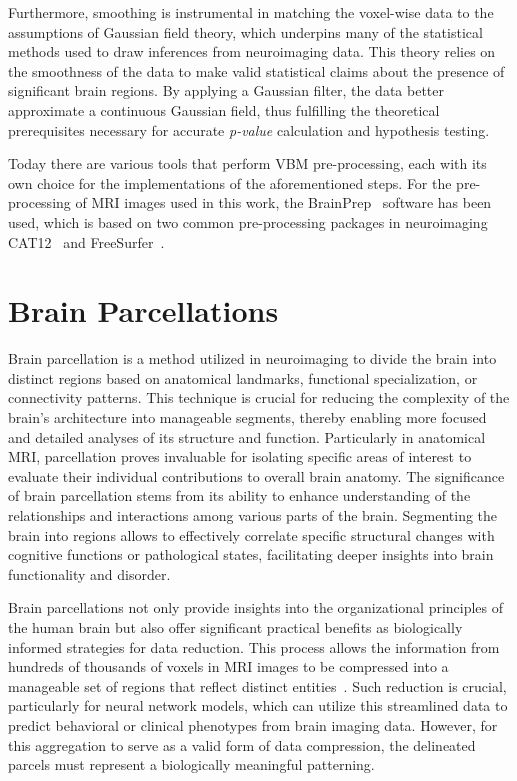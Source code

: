 Furthermore, smoothing is instrumental in matching the voxel-wise data to the
assumptions of Gaussian field theory, which underpins many of the statistical
methods used to draw inferences from neuroimaging data. This theory relies on
the smoothness of the data to make valid statistical claims about the presence
of significant brain regions. By applying a Gaussian filter, the data better
approximate a continuous Gaussian field, thus fulfilling the theoretical
prerequisites necessary for accurate \emph{p-value} calculation and hypothesis
testing.

Today there are various tools that perform VBM pre-processing, each with its own
choice for the implementations of the aforementioned steps. For the
pre-processing of MRI images used in this work, the
BrainPrep~\cite{grigis_brainprep_2022} software has been used, which is based on
two common pre-processing packages in neuroimaging CAT12~\cite{gaser_cat_2022}
and FreeSurfer~\cite{fischl_freesurfer_2012}.


\section{Brain Parcellations}
Brain parcellation is a method utilized in neuroimaging to divide the brain into
distinct regions based on anatomical landmarks, functional specialization, or
connectivity patterns. This technique is crucial for reducing the complexity of
the brain's architecture into manageable segments, thereby enabling more focused
and detailed analyses of its structure and function. Particularly in anatomical
MRI, parcellation proves invaluable for isolating specific areas of interest to
evaluate their individual contributions to overall brain anatomy.
The significance of brain
parcellation stems from its ability to enhance understanding of the
relationships and interactions among various parts of the brain. Segmenting the
brain into regions allows to effectively correlate specific structural changes
with cognitive functions or pathological states, facilitating deeper insights
into brain functionality and disorder.

Brain parcellations not only provide insights into the organizational principles
of the human brain but also offer significant practical benefits as biologically
informed strategies for data reduction. This process allows the information from
hundreds of thousands of voxels in MRI images to be compressed into a manageable
set of regions that reflect distinct
entities~. Such reduction is crucial,
particularly for neural network models, which can utilize this streamlined data
to predict behavioral or clinical phenotypes from brain imaging data. However,
for this aggregation to serve as a valid form of data compression, the
delineated parcels must represent a biologically meaningful patterning.

